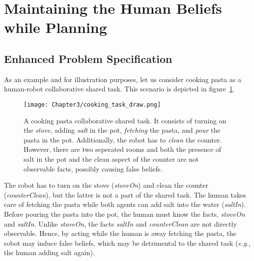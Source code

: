 \section{Maintaining the Human Beliefs while Planning}

    \subsection{Enhanced Problem Specification}

As an example and for illustration purposes, let us consider cooking pasta as a human-robot collaborative shared task. This scenario is depicted in figure~\ref{fig:cooking_task}.

\begin{figure}[h]
    \centering
    \texttt{[image: Chapter3/cooking\_task\_draw.png]}
    \caption{
        A cooking pasta collaborative shared task. It consists of turning on the \textit{stove}, adding \textit{salt} in the pot, \textit{fetching} the pasta, and \textit{pour} the pasta in the pot. Additionally, the robot has to \textit{clean} the counter. However, there are two seperated rooms and both the presence of salt in the pot and the clean aspect of the counter are not observable facts, possibly causing false beliefs.
    }
    \label{fig:cooking_task}
\end{figure}

The robot has to turn on the stove (\textit{stoveOn}) and clean the counter (\textit{counterClean}), but the latter is not a part of the shared task. The human takes care of fetching the pasta while both agents can add salt into the water (\textit{saltIn}). Before pouring the pasta into the pot, the human must know the facts, \textit{stoveOn} and \textit{saltIn}. 
Unlike \textit{stoveOn}, the facts \textit{saltIn} and \textit{counterClean} are not directly observable. 
Hence, by acting while the human is away fetching the pasta, the robot may induce false beliefs, which may be detrimental to the shared task (\textit{e.g.}, the human adding salt again).


